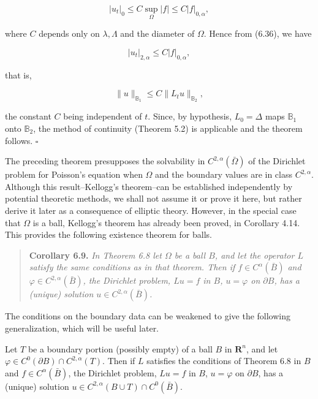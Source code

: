 \[
\lvert u_t \rvert_{0} \le C \sup_{\Omega} \lvert f \rvert \le C \lvert f \rvert_{0,\alpha},
\]

where $C$ depends only on $\lambda, \Lambda$ and the diameter of $\Omega$. Hence from (6.36), we have

\begin{equation}
\tag{6.42}
\lvert u_t \rvert_{2,\alpha} \le C \lvert f \rvert_{0,\alpha},
\end{equation}

that is,

\[
\lVert u \rVert_{\mathbb{B}_1} \le C \lVert L_tu \rVert_{\mathbb{B}_2},
\]

the constant $C$ being independent of $t$. Since, by hypothesis, $L_0 = \Delta$ maps $\mathbb{B}_1$ onto $\mathbb{B}_2$, the method of continuity (Theorem 5.2) is applicable and the theorem follows. $\square$

The preceding theorem presupposes the solvability in $C^{2,\alpha}(\bar{\Omega})$ of the Dirichlet problem for Poisson's equation when $\Omega$ and the boundary values are in class $C^{2,\alpha}$. Although this result--Kellogg's theorem--can be established independently by potential theoretic methods, we shall not assume it or prove it here, but rather derive it later as a consequence of elliptic theory. However, in the special case that $\Omega$ is a ball, Kellogg's theorem has already been proved, in Corollary 4.14. This provides the following existence theorem for balls.

\begin{quote}
\textbf{Corollary 6.9.} \textit{In Theorem 6.8 let $\Omega$ be a ball $B$, and let the operator $L$ satisfy the same conditions as in that theorem. Then if $f \in C^\alpha(\bar{B})$ and $\varphi \in C^{2,\alpha}(\bar{B})$, the Dirichlet problem, $Lu=f$ in $B$, $u=\varphi$ on $\partial B$, has a (unique) solution $u \in C^{2,\alpha}(\bar{B})$.}
\end{quote}

The conditions on the boundary data can be weakened to give the following generalization, which will be useful later.



\begin{lemma}[6.10]
Let $T$ be a boundary portion (possibly empty) of a ball $B$ in $\mathbf{R}^n$, and let $\varphi \in C^0(\partial B) \cap C^{2,\alpha}(T)$. Then if $L$ satisfies the conditions of Theorem 6.8 in $B$ and $f \in C^\alpha(\bar B)$, the Dirichlet problem, $Lu=f$ in $B$, $u=\varphi$ on $\partial B$, has a (unique) solution $u \in C^{2,\alpha}(B \cup T) \cap C^0(\bar B)$.
\end{lemma}

